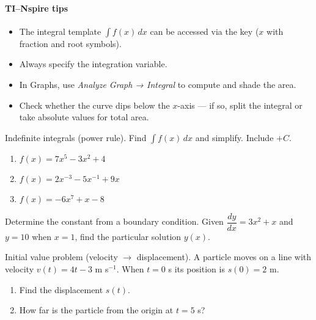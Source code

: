 \documentclass[11pt]{article}
\newcommand{\btn}[1]{\fbox{\sffamily\footnotesize #1}}
\def\textbf#1{#1}%
\newcounter{question}
\begin{document}
\paragraph{TI–Nspire tips}
\begin{itemize}[itemsep=1pt]
  \item The integral template \(\int f(x) \, dx\) can be accessed via the \btn{Template} key (\(\boxed{x}\) with fraction and root symbols).
  \item Always specify the integration variable.
  \item In Graphs, use \emph{Analyze Graph → Integral} to compute and shade the area.
  \item Check whether the curve dips below the \(x\)-axis — if so, split the integral or take absolute values for total area.
\end{itemize}


\begin{question}
\textbf{Indefinite integrals (power rule).}
Find $\displaystyle\int f(x)\,dx$ and simplify. Include $+C$.
\begin{enumerate}
  \item $f(x)=7x^{5}-3x^{2}+4$
  \item $f(x)=2x^{-3}-5x^{-1}+9x$
  \item $f(x)=-6x^{7}+x-8$
\end{enumerate}
\end{question}

\begin{question}
\textbf{Determine the constant from a boundary condition.}
Given $\dfrac{dy}{dx}=3x^{2}+x$ and $y=10$ when $x=1$, find the particular solution $y(x)$.
\end{question}

\begin{question}
\textbf{Initial value problem (velocity $\to$ displacement).}
A particle moves on a line with velocity $v(t)=4t-3$ m s$^{-1}$. When $t=0$ s its position is $s(0)=2$ m.
\begin{enumerate}
  \item Find the displacement $s(t)$.
  \item How far is the particle from the origin at $t=5$ s?
\end{enumerate}
\end{question}
\end{document}
